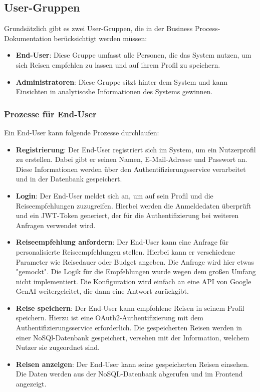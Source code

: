 \subsection{User-Gruppen}

Grundsätzlich gibt es zwei User-Gruppen, die in der Business Process-Dokumentation berücksichtigt werden müssen:

\begin{itemize}
    \item \textbf{End-User}: Diese Gruppe umfasst alle Personen, die das System nutzen, um sich Reisen empfehlen zu lassen und auf ihrem Profil zu speichern.
    \item \textbf{Administratoren}: Diese Gruppe sitzt hinter dem System und kann Einsichten in analytiscshe Informationen des Systems gewinnen.
\end{itemize}

\subsubsection{Prozesse für End-User}

Ein End-User kann folgende Prozesse durchlaufen:

\begin{itemize}
    \item \textbf{Registrierung}: Der End-User registriert sich im System, um ein Nutzerprofil zu erstellen. Dabei gibt er seinen Namen, E-Mail-Adresse und Passwort an. Diese Informationen werden über den Authentifizierungsservice verarbeitet und in der Datenbank gespeichert.
    \item \textbf{Login}: Der End-User meldet sich an, um auf sein Profil und die Reiseempfehlungen zuzugreifen. Hierbei werden die Anmeldedaten überprüft und ein JWT-Token generiert, der für die Authentifizierung bei weiteren Anfragen verwendet wird.
    \item \textbf{Reiseempfehlung anfordern}: Der End-User kann eine Anfrage für personalisierte Reiseempfehlungen stellen. Hierbei kann er verschiedene Parameter wie Reisedauer oder Budget angeben. Die Anfrage wird hier etwas "gemockt". Die Logik für die Empfehlungen wurde wegen dem großen Umfang nicht implementiert. Die Konfiguration wird einfach an eine API von Google GenAI weitergeleitet, die dann eine Antwort zurückgibt.
    \item \textbf{Reise speichern}: Der End-User kann empfohlene Reisen in seinem Profil speichern. Hierzu ist eine OAuth2-Authentifizierung mit dem Authentifizierungsservice erforderlich. Die gespeicherten Reisen werden in einer NoSQl-Datenbank gespeichert, versehen mit der Information, welchem Nutzer sie zugeordnet sind.
    \item \textbf{Reisen anzeigen}: Der End-User kann seine gespeicherten Reisen einsehen. Die Daten werden aus der NoSQL-Datenbank abgerufen und im Frontend angezeigt.
\end{itemize}

